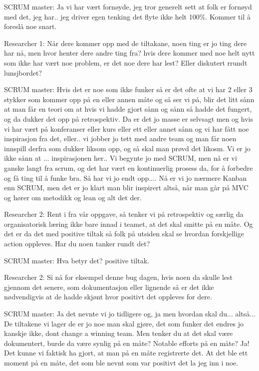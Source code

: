 \documentclass[12pt, a4paper]{report}
\begin{document}
SCRUM master: Ja vi har vært fornøyde, jeg tror generelt sett at folk er fornøyd med det, jeg har.. jeg driver egen tenking det flyte ikke helt 100\%. Kommer til å foreslå noe snart.

Researcher 1: Når dere kommer opp med de tiltakane, noen ting er jo ting dere har nå, men hvor henter dere andre ting fra? hvis dere kommer med noe helt nytt som ikke har vært noe problem, er det noe dere har lest? Eller diskutert rrundt lunsjbordet?

SCRUM master: Hvis det er noe som ikke funker så er det ofte at vi har 2 eller 3 stykker som kommer opp på en eller annen måte og så ser vi på, blir det litt sånn at man får en teori om at hvis vi hadde gjort sånn og sånn så hadde det fungert, og da dukker det opp på retrospektiv. Da er det jo masse er selvsagt men og hvis vi har vært på konferanser eller kurs eller ett eller annet sånn og vi har fått noe inspirasjon fra det, eller.. vi jobber jo tett med andre team og man får noen innspill derfra som dukker liksom opp, og så skal man prøvd det likosm. Vi er jo ikke sånn at ... inspirasjonen her.. Vi begynte jo med SCRUM, men nå er vi ganske langt fra scrum, og det har vært en kontinuerlig prosess da, for å forbedre og få ting til å funke bra. Så har vi jo endt opp.... Nå er vi jo nærmere Kanban enn SCRUM, men det er jo klart man blir inspirert altså, når man går på MVC og hører om metodikk og lean og alt det der. 

Researcher 2: Rent i fra vår oppgave, så tenker vi på retrospektiv og særlig da organisatorisk læring ikke bare innad i teamet, at det skal smitte på en måte. Og det er da det med positive tiltak så folk på utsiden skal se hvordan forskjellige action oppleves. Har du noen tanker rundt det?

SCRUM master: Hva betyr det? positive tiltak.

Researcher 2: Si nå for eksempel denne bug dagen, hvis noen da skulle lest gjennom det senere, som dokumentasjon eller lignende så er det ikke nødvendigvis at de hadde skjønt hvor positivt det oppleves for dere.

SCRUM master: Ja det nevnte vi jo tidligere og, ja men hvordan skal du... altså... De tiltakene vi lager de er jo noe man skal gjøre, det som funker det endres jo kanskje ikke, dont change a winning team. Men tenker du at det skal være dokumentert, burde da være synlig på en måte? Notable efforts på en måte? Ja! Det kunne vi faktisk ha gjort, at man på en måte registrerte det. At det ble ett moment på en måte, det som ble nevnt som var positivt det la jeg inn i noe. 
\end{document}

